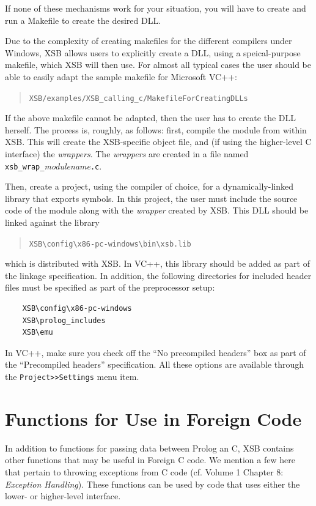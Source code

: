 If none of these mechanisms work for your situation, you will have to
create and run a Makefile to create the desired DLL. 

Due to the complexity of creating makefiles for the different compilers
under Windows, XSB allows users to explicitly create a DLL, using a
speical-purpose makefile, which XSB will then use.  For almost all typical
cases the user should be able to easily adapt the sample makefile for
Microsoft VC++:
\begin{quote}
 {\tt XSB/examples/XSB\_calling\_c/MakefileForCreatingDLLs}
\end{quote}

If the above makefile cannot be adapted, then the user has to create
the DLL herself.  The process is, roughly, as follows: first, compile
the module from within XSB.  This will create the XSB-specific object
file, and (if using the higher-level C interface) the
\emph{wrappers}. The \emph{wrappers} are created in a file named
\texttt{xsb\_wrap\_}\emph{modulename}\texttt{.c}.

Then, create a project, using the compiler of choice, for a
dynamically-linked library that exports symbols. In this project, the
user must include the source code of the module along with the
\emph{wrapper} created by XSB. This DLL should be linked against the
library
\begin{quote}
   \verb|XSB\config\x86-pc-windows\bin\xsb.lib|
\end{quote}
which is distributed with XSB. In VC++, this library should be added 
as part of the linkage specification. In addition, the following
directories for included header files must be specified as part of the
preprocessor setup:
\begin{verbatim}
    XSB\config\x86-pc-windows
    XSB\prolog_includes
    XSB\emu
\end{verbatim}
In VC++, make sure you check off the ``No precompiled headers'' box as part
of the ``Precompiled headers'' specification. All these options are
available through the {\tt Project>>Settings} menu item.

\section{Functions for Use in Foreign Code}

In addition to functions for passing data between Prolog an C, XSB
contains other functions that may be useful in Foreign C code.  We
mention a few here that pertain to throwing exceptions from C code
(cf. Volume 1 Chapter 8: {\em Exception Handling}).  These functions
can be used by code that uses either the lower- or higher-level
interface.

